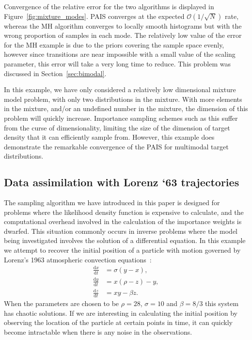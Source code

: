 \documentclass[final]{siamltex}
\begin{document}
Convergence of the relative error for the two algorithms is displayed
in Figure~\ref{fig:mixture_modes}. PAIS converges at the expected
$\mathcal{O}(1/\sqrt{N})$ rate, whereas the MH algorithm converges to
locally smooth histograms but with the wrong proportion of samples in
each mode. The relatively low value of the error for the MH example is
due to the priors covering the sample space evenly, however since
transitions are near impossible with a small value of the scaling
parameter, this error will take a very long time to reduce. This
problem was discussed in Section~\ref{sec:bimodal}.

In this example, we have only considered a relatively low dimensional
mixture model problem, with only two distributions in the
mixture. With more elements in the mixture, and/or an undefined number
in the mixture, the dimension of this problem will quickly
increase. Importance sampling schemes such as this suffer from the
curse of dimensionality, limiting the size of the dimension of target
density that it can efficiently sample from. However, this example
does demonstrate the remarkable convergence of the PAIS for multimodal
target distributions.

\subsection{Data assimilation with Lorenz `63 trajectories}\label{sec:lorenz}

The sampling algorithm we have introduced in this paper is designed for problems where the likelihood density function is expensive to calculate, and the computational overhead involved in the calculation of the importance weights is dwarfed. This situation commonly occurs in inverse problems where the model being investigated involves the solution of a differential equation. In this example we attempt to recover the initial position of a particle with motion governed by Lorenz's 1963 atmospheric convection equations~\cite{lorenz1963deterministic}:
\begin{align*}
	\frac{\text{d}x}{\text{d}t} &= \sigma(y-x), \\
	\frac{\text{d}y}{\text{d}t} &= x(\rho-z)-y, \\
	\frac{\text{d}z}{\text{d}t} &= xy - \beta z.
\end{align*}
When the parameters are chosen to be $\rho = 28$, $\sigma=10$ and $\beta=8/3$ this system has chaotic solutions. If we are interesting in calculating the initial position by observing the location of the particle at certain points in time, it can quickly become intractable when there is any noise in the observations.
\end{document}
